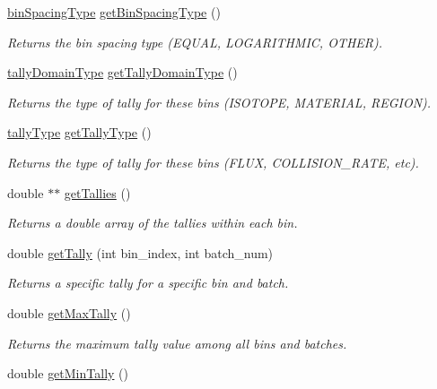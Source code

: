 \begin{DoxyCompactItemize}
\hyperlink{Tally_8h_ae351518d24ed6463681aeb5c590c975c}{bin\-Spacing\-Type} \hyperlink{classTally_adf407bd073de89237ab6d01036b3ee9f}{get\-Bin\-Spacing\-Type} ()
\begin{DoxyCompactList}\small\item\em Returns the bin spacing type (E\-Q\-U\-A\-L, L\-O\-G\-A\-R\-I\-T\-H\-M\-I\-C, O\-T\-H\-E\-R). \end{DoxyCompactList}\item 
\hyperlink{Tally_8h_a87b950219b1938f2969431f708ad82f4}{tally\-Domain\-Type} \hyperlink{classTally_ab210b0f87c084b590b13015c1cf5c571}{get\-Tally\-Domain\-Type} ()
\begin{DoxyCompactList}\small\item\em Returns the type of tally for these bins (I\-S\-O\-T\-O\-P\-E, M\-A\-T\-E\-R\-I\-A\-L, R\-E\-G\-I\-O\-N). \end{DoxyCompactList}\item 
\hyperlink{Tally_8h_ad9b32b34ff6309e7781de583a9fa3a81}{tally\-Type} \hyperlink{classTally_aa64325bb650b284d06921a446fca69d0}{get\-Tally\-Type} ()
\begin{DoxyCompactList}\small\item\em Returns the type of tally for these bins (F\-L\-U\-X, C\-O\-L\-L\-I\-S\-I\-O\-N\-\_\-\-R\-A\-T\-E, etc). \end{DoxyCompactList}\item 
double $\ast$$\ast$ \hyperlink{classTally_a08a4dc9960b25baaabf20cbdbad99d28}{get\-Tallies} ()
\begin{DoxyCompactList}\small\item\em Returns a double array of the tallies within each bin. \end{DoxyCompactList}\item 
double \hyperlink{classTally_afe131b5f6370aeb82ff4292e9ef3cb70}{get\-Tally} (int bin\-\_\-index, int batch\-\_\-num)
\begin{DoxyCompactList}\small\item\em Returns a specific tally for a specific bin and batch. \end{DoxyCompactList}\item 
double \hyperlink{classTally_aba62d4ef44ad3e929745481224bebec4}{get\-Max\-Tally} ()
\begin{DoxyCompactList}\small\item\em Returns the maximum tally value among all bins and batches. \end{DoxyCompactList}\item 
double \hyperlink{classTally_a39c6b05facabbf65f458f4a3e443d503}{get\-Min\-Tally} ()
$$
\end{DoxyCompactItemize}
